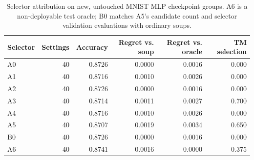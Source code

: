 \begin{table}[t]
\centering
\caption{Selector attribution on new, untouched MNIST MLP checkpoint groups. A6 is a non-deployable test oracle; B0 matches A5's candidate count and selector validation evaluations with ordinary soups.}
\label{tab:post-iclr-selector-attribution}
\begin{tabular}{lrrrrr}
\toprule
Selector & Settings & Accuracy & Regret vs. soup & Regret vs. oracle & TM selection \\
\midrule
A0 & 40 & 0.8726 & 0.0000 & 0.0016 & 0.000 \\
A1 & 40 & 0.8716 & 0.0010 & 0.0026 & 0.000 \\
A2 & 40 & 0.8726 & 0.0000 & 0.0016 & 0.000 \\
A3 & 40 & 0.8714 & 0.0011 & 0.0027 & 0.700 \\
A4 & 40 & 0.8716 & 0.0010 & 0.0026 & 0.000 \\
A5 & 40 & 0.8707 & 0.0019 & 0.0034 & 0.650 \\
B0 & 40 & 0.8726 & 0.0000 & 0.0016 & 0.000 \\
A6 & 40 & 0.8741 & -0.0016 & 0.0000 & 0.375 \\
\bottomrule
\end{tabular}
\end{table}
